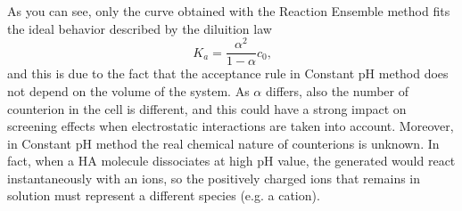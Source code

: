 \documentclass[
a4paper,                        %
11pt,                           %
twoside,                        %
footsepline,                    %
headsepline,                    %
headexclude,                    %
footexclude,                    %
pagesize,                       %
]{scrartcl}
\begin{document}
As you can see, only the curve obtained with the Reaction Ensemble method fits the ideal behavior described by the diluition law
\begin{equation}
K_{a} = \frac{\alpha^2}{1 - \alpha}c_0\text{,}
\end{equation}
and this is due to the fact that the acceptance  rule in Constant pH method does not depend on the volume of the system. As $\alpha$ differs, also the number of counterion in the cell is different, and this could have a strong impact on screening effects when electrostatic interactions are taken into account. Moreover, in Constant pH method the real chemical nature of counterions is unknown. In fact, when a HA molecule dissociates at high pH value, the generated  would react instantaneously with an  ions, so the positively charged ions that remains in solution must represent a different species (e.g. a  cation).
\end{document}
